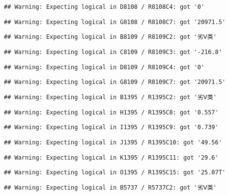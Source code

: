 \documentclass[
]{article}
\begin{document}
\begin{verbatim}
## Warning: Expecting logical in D8108 / R8108C4: got '0'
\end{verbatim}

\begin{verbatim}
## Warning: Expecting logical in G8108 / R8108C7: got '20971.5'
\end{verbatim}

\begin{verbatim}
## Warning: Expecting logical in B8109 / R8109C2: got '劣Ⅴ类'
\end{verbatim}

\begin{verbatim}
## Warning: Expecting logical in C8109 / R8109C3: got '-216.8'
\end{verbatim}

\begin{verbatim}
## Warning: Expecting logical in D8109 / R8109C4: got '0'
\end{verbatim}

\begin{verbatim}
## Warning: Expecting logical in G8109 / R8109C7: got '20971.5'
\end{verbatim}

\begin{verbatim}
## Warning: Expecting logical in B1395 / R1395C2: got '劣Ⅴ类'
\end{verbatim}

\begin{verbatim}
## Warning: Expecting logical in H1395 / R1395C8: got '0.557'
\end{verbatim}

\begin{verbatim}
## Warning: Expecting logical in I1395 / R1395C9: got '0.739'
\end{verbatim}

\begin{verbatim}
## Warning: Expecting logical in J1395 / R1395C10: got '49.56'
\end{verbatim}

\begin{verbatim}
## Warning: Expecting logical in K1395 / R1395C11: got '29.6'
\end{verbatim}

\begin{verbatim}
## Warning: Expecting logical in O1395 / R1395C15: got '25.07T'
\end{verbatim}

\begin{verbatim}
## Warning: Expecting logical in B5737 / R5737C2: got '劣Ⅴ类'
\end{verbatim}
\end{document}
